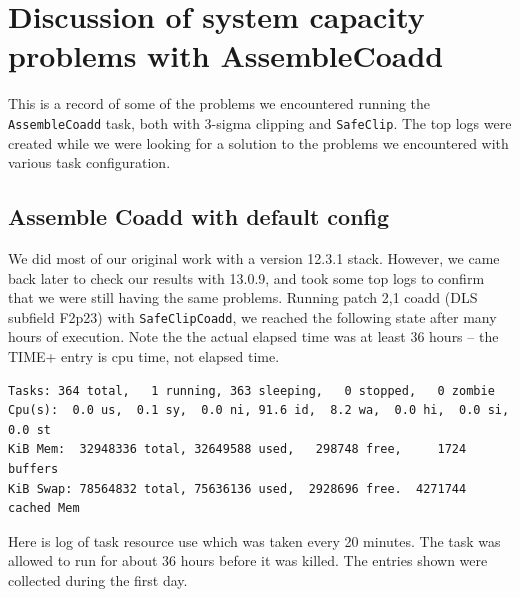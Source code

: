 \documentclass[modern]{aastex61}
\begin{document}
\bigskip





\appendix
\section{Discussion of system capacity problems with AssembleCoadd}
This is a record of some of the problems we encountered running the {\tt\string AssembleCoadd} task, both with 3-sigma clipping and {\tt\string SafeClip}. The top logs were created while we were looking for a solution to the problems we encountered with various task configuration.
\subsection{Assemble Coadd with default config}
We did most of our original work with a version 12.3.1 stack.  However, we came back later to check our results with 13.0.9, and took some top logs to confirm that we were still having the same problems.  Running patch 2,1 coadd (DLS subfield F2p23) with {\tt\string SafeClipCoadd}, we reached the following state after many hours of execution.  Note the the actual elapsed time was at least 36 hours -- the TIME+ entry is cpu time, not elapsed time.

\begin{small}
\begin{verbatim}
Tasks: 364 total,   1 running, 363 sleeping,   0 stopped,   0 zombie
Cpu(s):  0.0 us,  0.1 sy,  0.0 ni, 91.6 id,  8.2 wa,  0.0 hi,  0.0 si,  0.0 st
KiB Mem:  32948336 total, 32649588 used,   298748 free,     1724 buffers
KiB Swap: 78564832 total, 75636136 used,  2928696 free.  4271744 cached Mem
\end{verbatim}
\end{small}

Here is log of task resource use which was taken every 20 minutes. The task was allowed to run for about 36 hours before it was killed. The entries shown were collected during the first day.
\end{document}
